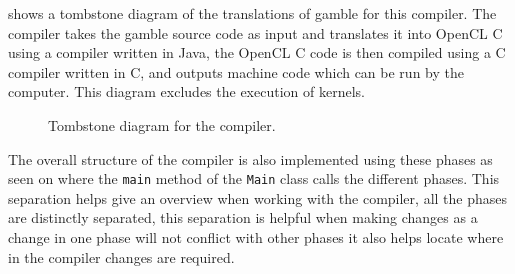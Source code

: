  shows a tombstone diagram of the translations of \gls{gamble} for this compiler.
The compiler takes the \gls{gamble} source code as input and translates it into OpenCL C using a compiler written in Java, the OpenCL C code is then compiled using a C compiler written in C, and outputs machine code which can be run by the computer. 
This diagram excludes the execution of kernels.
\begin{figure}[!ht]
\centering
{}
\caption{Tombstone diagram for the compiler.}
\label{fig:tombstone}
\end{figure}


The overall structure of the compiler is also implemented using these phases as seen on  where the \texttt{main} method of the \texttt{Main} class calls the different phases.
This separation helps give an overview when working with the compiler, all the phases are distinctly separated, this separation is helpful when making changes as a change in one phase will not conflict with other phases it also helps locate where in the compiler changes are required.

